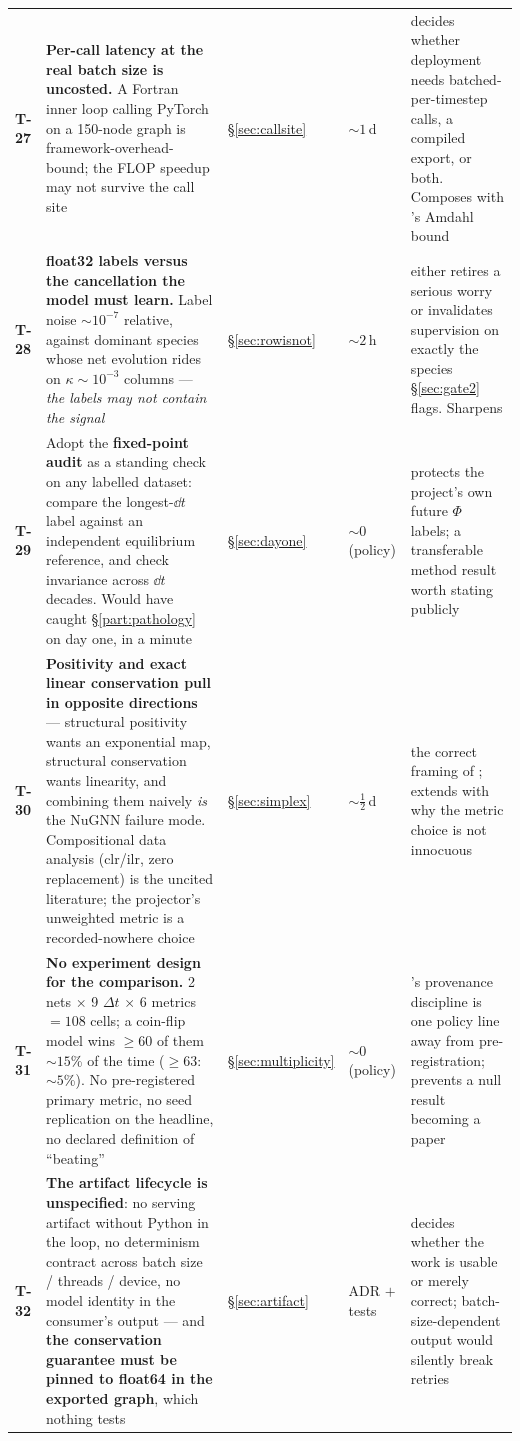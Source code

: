 \begin{longtable}{@{}L{1.0cm} L{6.0cm} L{2.2cm} L{1.7cm} L{4.7cm}@{}}
\textbf{T-27} &
\textbf{Per-call latency at the real batch size is uncosted.} A Fortran inner
loop calling PyTorch on a 150-node graph is framework-overhead-bound; the FLOP
speedup may not survive the call site & \S\ref{sec:callsite} & ${\sim}1$\,d &
decides whether deployment needs batched-per-timestep calls, a compiled
export, or both. Composes with 's Amdahl bound \\

\textbf{T-28} &
\warnglyph{} \textbf{float32 labels versus the cancellation the model must
learn.} Label noise ${\sim}10^{-7}$ relative, against dominant species whose
net evolution rides on $\kappa \sim 10^{-3}$ columns --- \emph{the labels may
not contain the signal} & \S\ref{sec:rowisnot} & ${\sim}2$\,h &
either retires a serious worry or invalidates supervision on exactly the
species \S\ref{sec:gate2} flags. Sharpens  \\

\textbf{T-29} &
Adopt the \textbf{fixed-point audit} as a standing check on any labelled
dataset: compare the longest-$\dd t$ label against an independent
equilibrium reference, and check invariance across $\dd t$ decades. Would
have caught \S\ref{part:pathology} on day one, in a minute &
\S\ref{sec:dayone} & ${\sim}0$ (policy) &
protects the project's own future $\Phi$ labels; a transferable method result
worth stating publicly \\

\textbf{T-30} &
\textbf{Positivity and exact linear conservation pull in opposite directions}
--- structural positivity wants an exponential map, structural conservation
wants linearity, and combining them naively \emph{is} the NuGNN failure mode.
Compositional data analysis (clr/ilr, zero replacement) is the uncited
literature; the projector's unweighted metric is a recorded-nowhere choice &
\S\ref{sec:simplex} & ${\sim}\tfrac12$\,d &
the correct framing of ; extends 
with why the metric choice is not innocuous \\

\textbf{T-31} &
\textbf{No experiment design for the comparison.} 2 nets $\times$ 9
$\Delta t$ $\times$ 6 metrics $= 108$ cells; a coin-flip model wins $\ge 60$
of them ${\sim}15$\% of the time ($\ge 63$: ${\sim}5$\%). No pre-registered
primary metric, no seed replication on the headline, no declared definition
of ``beating'' & \S\ref{sec:multiplicity} & ${\sim}0$ (policy) &
's provenance discipline is one policy line away from
pre-registration; prevents a null result becoming a paper \\

\textbf{T-32} &
\textbf{The artifact lifecycle is unspecified}: no serving artifact without
Python in the loop, no determinism contract across batch size / threads /
device, no model identity in the consumer's output --- and \textbf{the
conservation guarantee must be pinned to float64 in the exported graph},
which nothing tests & \S\ref{sec:artifact} & ADR $+$ tests &
decides whether the work is usable or merely correct; batch-size-dependent
output would silently break retries \\
\end{longtable}
